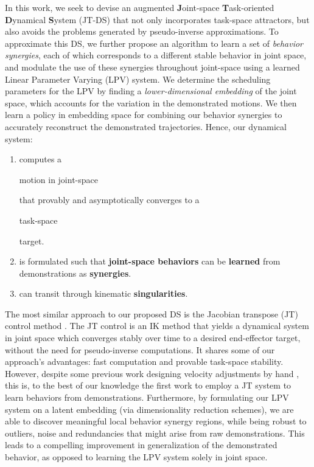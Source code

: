 \documentclass[letterpaper, 10 pt, journal, twoside, fleqn]{IEEEtran}
\begin{document}
In this work, we seek to devise an augmented \textbf{J}oint-space \textbf{T}ask-oriented \textbf{D}ynamical \textbf{S}ystem (JT-DS) that not only incorporates task-space attractors, but also avoids the problems generated by pseudo-inverse approximations. To approximate this DS, we further propose an algorithm to learn a set of \emph{behavior synergies}, each of which corresponds to a different stable behavior in joint space, and modulate the use of these synergies throughout joint-space using a learned Linear Parameter Varying (LPV) system. We determine the scheduling parameters for the LPV by finding a \emph{lower-dimensional embedding} of the joint space, which accounts for the variation in the demonstrated motions. We then learn a policy in embedding space for combining our behavior synergies to accurately reconstruct the demonstrated trajectories.
Hence, our dynamical system:
\begin{enumerate}[leftmargin=*]
\item computes a \begin{bf}motion in joint-space\end{bf} that provably and asymptotically converges to a \begin{bf}task-space \end{bf}target.
\item is formulated such that \textbf{joint-space behaviors} can be \textbf{learned} from demonstrations as \textbf{synergies}.
\item can transit through kinematic \textbf{singularities}.
\end{enumerate}


The most similar approach to our proposed DS is the Jacobian transpose (JT) control method \cite{wolovich1984computational} . The JT control is an IK method that yields a dynamical system in joint space
which converges stably over time to a desired end-effector target, without the need for pseudo-inverse computations. It shares some of our approach's advantages: fast computation and provable task-space stability. However, despite some previous work designing velocity adjustments by hand \cite{Shi2016}, this is, to the best of our knowledge the first work to employ a JT system to learn behaviors from demonstrations. Furthermore, by formulating our LPV system on a latent embedding (via dimensionality reduction schemes), we are able to discover meaningful local behavior synergy regions, while being robust to outliers, noise and redundancies that might arise from raw demonstrations. This leads to a compelling improvement in generalization of the demonstrated behavior, as opposed to learning the LPV system solely in joint space. 
\end{document}
